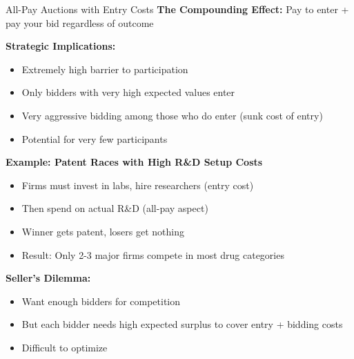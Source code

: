 \documentclass[xcolor={x11names}]{beamer}
\begin{document}
\begin{frame}{All-Pay Auctions with Entry Costs}
\textbf{The Compounding Effect:} Pay to enter + pay your bid regardless of outcome


\textbf{Strategic Implications:}
\begin{itemize}
  \item Extremely high barrier to participation
  \item Only bidders with very high expected values enter
  \item Very aggressive bidding among those who do enter (sunk cost of entry)
  \item Potential for very few participants
\end{itemize}


\textbf{Example: Patent Races with High R\&D Setup Costs}
\begin{itemize}
  \item Firms must invest in labs, hire researchers (entry cost)
  \item Then spend on actual R\&D (all-pay aspect)
  \item Winner gets patent, losers get nothing
  \item Result: Only 2-3 major firms compete in most drug categories
\end{itemize}


\textbf{Seller's Dilemma:}
\begin{itemize}
  \item Want enough bidders for competition
  \item But each bidder needs high expected surplus to cover entry + bidding costs
  \item Difficult to optimize
\end{itemize}
\end{frame}
\end{document}

